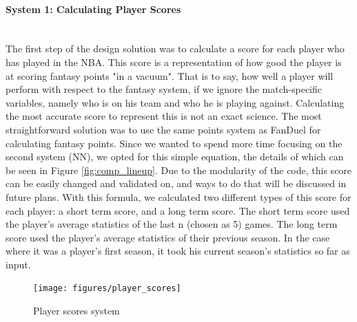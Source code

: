 \paragraph{System 1: Calculating Player Scores}\mbox{}\\
The first step of the design solution was to calculate a score for each player who has played in the NBA. This score is a representation of how good the player is at scoring fantasy points "in a vacuum". That is to say, how well a player will perform with respect to the fantasy system, if we ignore the match-specific variables, namely who is on his team and who he is playing against. Calculating the most accurate score to represent this is not an exact science. The most straightforward solution was to use the same points system as FanDuel for calculating fantasy points. Since we wanted to spend more time focusing on the second system (NN), we opted for this simple equation, the details of which can be seen in Figure \ref{fig:comp_lineup}. Due to the modularity of the code, this score can be easily changed and validated on, and ways to do that will be discussed in future plans. With this formula, we calculated two different types of this score for each player: a short term score, and a long term score. The short term score used the player's average statistics of the last n (chosen as 5) games. The long term score used the player's average statistics of their previous season. In the case where it was a player's first season, it took his current season's statistics so far as input.
\begin{figure}[ht]
    \centering
    \texttt{[image: figures/player\_scores]}
    \caption{Player scores system}
    \label{fig:player_scores}
\end{figure}
